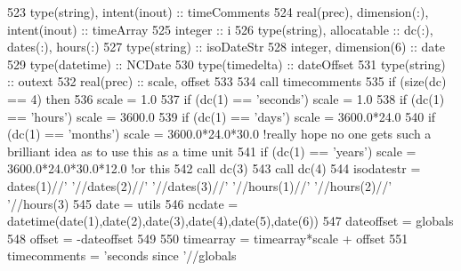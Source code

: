\begin{DoxyCode}
523     \textcolor{keywordtype}{type}(string), \textcolor{keywordtype}{intent(inout)} :: timeComments
524     \textcolor{keywordtype}{real(prec)}, \textcolor{keywordtype}{dimension(:)}, \textcolor{keywordtype}{intent(inout)} :: timeArray
525     \textcolor{keywordtype}{integer} :: i
526     \textcolor{keywordtype}{type}(string), \textcolor{keywordtype}{allocatable} :: dc(:), dates(:), hours(:)
527     \textcolor{keywordtype}{type}(string) :: isoDateStr
528     \textcolor{keywordtype}{integer}, \textcolor{keywordtype}{dimension(6)} :: date
529     \textcolor{keywordtype}{type}(datetime) :: NCDate
530     \textcolor{keywordtype}{type}(timedelta) :: dateOffset
531     \textcolor{keywordtype}{type}(string) :: outext
532     \textcolor{keywordtype}{real(prec)} :: scale, offset
533 
534     \textcolor{keyword}{call }timecomments%
535     \textcolor{keywordflow}{if} (\textcolor{keyword}{size}(dc) == 4) \textcolor{keywordflow}{then}
536         scale = 1.0
537         \textcolor{keywordflow}{if} (dc(1) == \textcolor{stringliteral}{'seconds'}) scale = 1.0
538         \textcolor{keywordflow}{if} (dc(1) == \textcolor{stringliteral}{'hours'})   scale = 3600.0
539         \textcolor{keywordflow}{if} (dc(1) == \textcolor{stringliteral}{'days'})    scale = 3600.0*24.0
540         \textcolor{keywordflow}{if} (dc(1) == \textcolor{stringliteral}{'months'})  scale = 3600.0*24.0*30.0 \textcolor{comment}{!really hope no one gets such a brilliant idea as
       to use this as a time unit}
541         \textcolor{keywordflow}{if} (dc(1) == \textcolor{stringliteral}{'years'})   scale = 3600.0*24.0*30.0*12.0 \textcolor{comment}{!or this}
542         \textcolor{keyword}{call }dc(3)%
543         \textcolor{keyword}{call }dc(4)%
544         isodatestr = dates(1)//\textcolor{stringliteral}{' '}//dates(2)//\textcolor{stringliteral}{' '}//dates(3)//\textcolor{stringliteral}{' '}//hours(1)//\textcolor{stringliteral}{' '}//hours(2)//\textcolor{stringliteral}{' '}//hours(3)
545         date = utils%
546         ncdate = datetime(date(1),date(2),date(3),date(4),date(5),date(6))
547         dateoffset = globals%
548         offset = -dateoffset%
549 
550         timearray = timearray*scale + offset
551         timecomments = \textcolor{stringliteral}{'seconds since '}//globals%

\end{DoxyCode}
